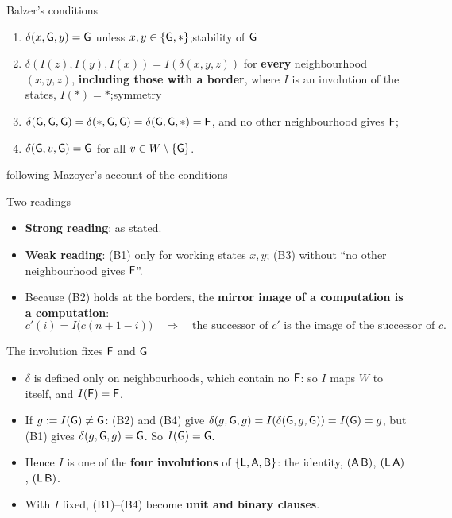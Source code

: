 \begin{frame}{Balzer's conditions}
\begin{enumerate}[(B1)]
\item $\delta(x,\mathsf G,y)=\mathsf G$ unless $x,y\in\{\mathsf G,\ast\}$;\hfill\textcolor{mute}{stability of $\mathsf G$}
\item $\delta(I(z),I(y),I(x))=I(\delta(x,y,z))$ for \textbf{every} neighbourhood $(x,y,z)$, \textbf{including those with a border}, where $I$ is an involution of the states, $I(\ast)=\ast$;\hfill\textcolor{mute}{symmetry}
\item $\delta(\mathsf G,\mathsf G,\mathsf G)=\delta(\ast,\mathsf G,\mathsf G)=\delta(\mathsf G,\mathsf G,\ast)=\mathsf F$, and no other neighbourhood gives $\mathsf F$;
\item $\delta(\mathsf G,v,\mathsf G)=\mathsf G$ for all $v\in W\setminus\{\mathsf G\}$.
\end{enumerate}
\vspace{1ex}
\small following Mazoyer's account of the conditions
\end{frame}

\begin{frame}{Two readings}
\begin{itemize}
\item \textbf{Strong reading}: as stated.
\item \textbf{Weak reading}: (B1) only for working states $x,y$; (B3) without ``no other neighbourhood gives $\mathsf F$''.
\item Because (B2) holds at the borders, the \textbf{mirror image of a computation is a computation}:
\[c'(i)=I\bigl(c(n+1-i)\bigr)\quad\Rightarrow\quad \text{the successor of }c'\text{ is the image of the successor of }c.\]
\end{itemize}
\end{frame}

\begin{frame}{The involution fixes $\mathsf F$ and $\mathsf G$}
\begin{itemize}
\item $\delta$ is defined only on neighbourhoods, which contain no $\mathsf F$: so $I$ maps $W$ to itself, and $I(\mathsf F)=\mathsf F$.
\item If $g:=I(\mathsf G)\ne\mathsf G$: (B2) and (B4) give $\delta(g,\mathsf G,g)=I(\delta(\mathsf G,g,\mathsf G))=I(\mathsf G)=g$, but (B1) gives $\delta(g,\mathsf G,g)=\mathsf G$. So $I(\mathsf G)=\mathsf G$.
\item Hence $I$ is one of the \textbf{four involutions} of $\{\mathsf L,\mathsf A,\mathsf B\}$: the identity, $(\mathsf A\,\mathsf B)$, $(\mathsf L\,\mathsf A)$, $(\mathsf L\,\mathsf B)$.
\item With $I$ fixed, (B1)--(B4) become \textbf{unit and binary clauses}.
\end{itemize}
\end{frame}

